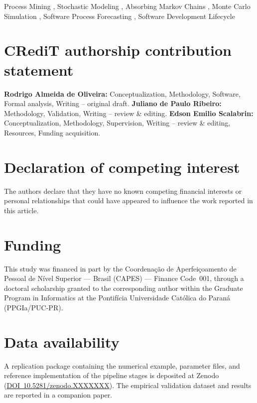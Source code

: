 \documentclass[review,3p,times]{elsarticle}
\newcommand{\zenododoi}{10.5281/zenodo.XXXXXXX}
\newcommand{\zenododoiurl}{https://doi.org/\zenododoi}
\begin{document}
\begin{frontmatter}
\begin{keyword}
Process Mining \sep
Stochastic Modeling \sep
Absorbing Markov Chains \sep
Monte Carlo Simulation \sep
Software Process Forecasting \sep
Software Development Lifecycle
\end{keyword}

\end{frontmatter}












\section*{CRediT authorship contribution statement}
\textbf{Rodrigo Almeida de Oliveira:} Conceptualization, Methodology,
Software, Formal analysis, Writing -- original draft.
\textbf{Juliano de Paulo Ribeiro:} Methodology, Validation,
Writing -- review \& editing.
\textbf{Edson Emilio Scalabrin:} Conceptualization, Methodology,
Supervision, Writing -- review \& editing, Resources, Funding acquisition.

\section*{Declaration of competing interest}
The authors declare that they have no known competing financial interests
or personal relationships that could have appeared to influence the work
reported in this article.

\section*{Funding}
This study was financed in part by the Coordena\c c\~ao de Aperfei\c
coamento de Pessoal de N\'ivel Superior --- Brasil (CAPES) ---
Finance Code~001, through a doctoral scholarship granted to the
corresponding author within the Graduate Program in Informatics at the
Pontif\'icia Universidade Cat\'olica do Paran\'a (PPGIa/PUC-PR).

\section*{Data availability}
A replication package containing the numerical example, parameter files,
and reference implementation of the pipeline stages is deposited at
Zenodo (\href{\zenododoiurl}{DOI~\zenododoi}). The empirical
validation dataset and results are reported in a companion paper.


\end{document}
